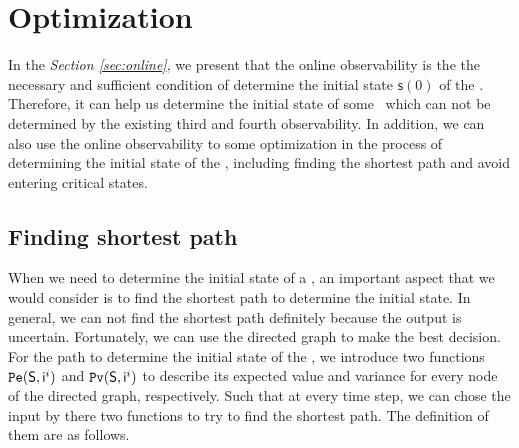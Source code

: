 \section{Optimization}
\label{sec:app}

In the {\em Section \ref{sec:online}}, we present that the online observability is the the necessary and sufficient condition of determine the initial state $\mathsf{s}(0)$ of the \BCNs. Therefore, it can help us determine the initial state of some \BCNs\ which can not be determined by the existing third and fourth observability. In addition, we can also use the online observability to some optimization in the process of determining the initial state of the \BCNs, including finding the shortest path and avoid entering critical states. %


\subsection{Finding shortest path}
When we need to determine the initial state of a \BCN, an important aspect that we would consider is to find the shortest path to determine the initial state. In general, we can not find the shortest path definitely because the output is uncertain. Fortunately, we can use the directed graph to make the best decision. For the path to determine the initial state of the \BCNs, we introduce two functions ${\tt Pe}(\mathsf{S},\mathsf{ i}^{i})$ and ${\tt Pv}(\mathsf{S},\mathsf{ i}^{i})$ to describe its expected value and variance for every node of the directed graph, respectively. Such that at every time step, we can chose the input by there two functions to try to find the shortest path. The definition of them are as follows.




